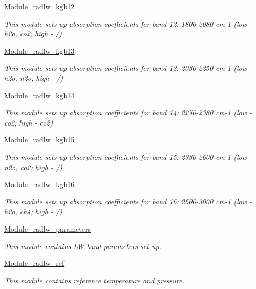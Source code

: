 \begin{DoxyCompactItemize}
\hyperlink{group__module__radlw__kgb12}{Module\+\_\+radlw\+\_\+kgb12}
\begin{DoxyCompactList}\small\item\em This module sets up absorption coefficients for band 12\+: 1800-\/2080 cm-\/1 (low -\/ h2o, co2; high -\/ /) \end{DoxyCompactList}\item 
\hyperlink{group__module__radlw__kgb13}{Module\+\_\+radlw\+\_\+kgb13}
\begin{DoxyCompactList}\small\item\em This module sets up absorption coefficients for band 13\+: 2080-\/2250 cm-\/1 (low -\/ h2o, n2o; high -\/ /) \end{DoxyCompactList}\item 
\hyperlink{group__module__radlw__kgb14}{Module\+\_\+radlw\+\_\+kgb14}
\begin{DoxyCompactList}\small\item\em This module sets up absorption coefficients for band 14\+: 2250-\/2380 cm-\/1 (low -\/ co2; high -\/ co2) \end{DoxyCompactList}\item 
\hyperlink{group__module__radlw__kgb15}{Module\+\_\+radlw\+\_\+kgb15}
\begin{DoxyCompactList}\small\item\em This module sets up absorption coefficients for band 15\+: 2380-\/2600 cm-\/1 (low -\/ n2o, co2; high -\/ /) \end{DoxyCompactList}\item 
\hyperlink{group__module__radlw__kgb16}{Module\+\_\+radlw\+\_\+kgb16}
\begin{DoxyCompactList}\small\item\em This module sets up absorption coefficients for band 16\+: 2600-\/3000 cm-\/1 (low -\/ h2o, ch4; high -\/ /) \end{DoxyCompactList}\item 
\hyperlink{group__module__radlw__parameters}{Module\+\_\+radlw\+\_\+parameters}
\begin{DoxyCompactList}\small\item\em This module contains LW band parameters set up. \end{DoxyCompactList}\item 
\hyperlink{group__module__radlw__ref}{Module\+\_\+radlw\+\_\+ref}
\begin{DoxyCompactList}\small\item\em This module contains reference temperature and pressure. \end{DoxyCompactList}\end{DoxyCompactItemize}
